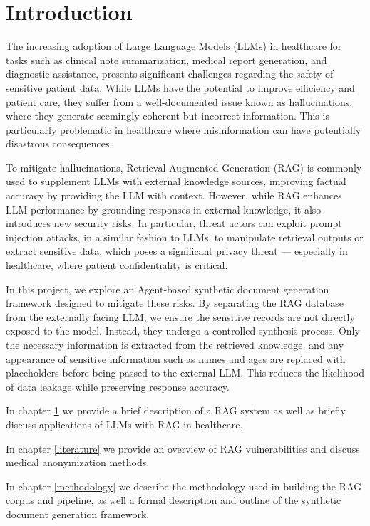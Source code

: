 \chapter{Introduction} \label{introduction}
The increasing adoption of Large Language Models (LLMs) in healthcare for tasks such as clinical note summarization, medical report generation, and diagnostic assistance, presents significant challenges regarding the safety of sensitive patient data. While LLMs have the potential to improve efficiency and patient care, they suffer from a well-documented issue known as hallucinations, where they generate seemingly coherent but incorrect information. This is particularly problematic in healthcare where misinformation can have potentially disastrous consequences.

To mitigate hallucinations, Retrieval-Augmented Generation (RAG) is commonly used to supplement LLMs with external knowledge sources, improving factual accuracy by providing the LLM with context. However, while RAG enhances LLM performance by grounding responses in external knowledge, it also introduces new security risks. In particular, threat actors can exploit prompt injection attacks, in a similar fashion to LLMs, to manipulate retrieval outputs or extract sensitive data, which poses a significant privacy threat — especially in healthcare, where patient confidentiality is critical.

In this project, we explore an Agent-based synthetic document generation framework designed to mitigate these risks. By separating the RAG database from the externally facing LLM, we ensure the sensitive records are not directly exposed to the model. Instead, they undergo a controlled synthesis process. Only the necessary information is extracted from the retrieved knowledge, and any appearance of sensitive information such as names and ages are replaced with placeholders before being passed to the external LLM. This reduces the likelihood of data leakage while preserving response accuracy.

In chapter \ref{introduction} we provide a brief description of a RAG system as well as briefly discuss applications of LLMs with RAG in healthcare.

In chapter \ref{literature} we provide an overview of RAG vulnerabilities and discuss medical anonymization methods.

In chapter \ref{methodology} we describe the methodology used in building the RAG corpus and pipeline, as well a formal description and outline of the synthetic document generation framework.

